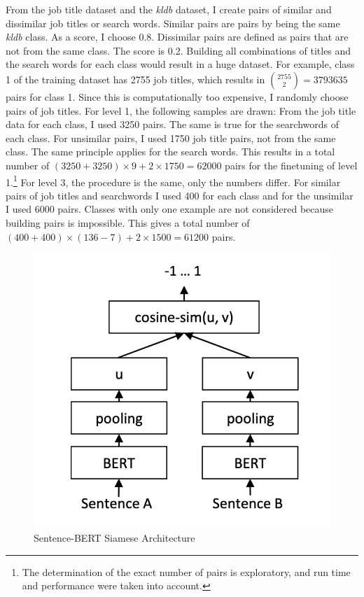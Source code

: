 \documentclass[12pt, a4paper, titlepage]{article}
\begin{document}
From the job title dataset and the \textit{kldb} dataset, I create pairs of similar and dissimilar job titles or search words. Similar pairs are pairs by being the same \textit{kldb} class. As a score, I choose 0.8. Dissimilar pairs are defined as pairs that are not from the same class. The score is 0.2. Building all combinations of titles and the search words for each class would result in a huge dataset. For example, class 1 of the training dataset has 2755 job titles, which results in ${2755 \choose 2} = 3793635$ pairs for class 1. Since this is computationally too expensive, I randomly choose pairs of job titles. For level 1, the following samples are drawn: From the job title data for each class, I used 3250 pairs. The same is true for the searchwords of each class. For unsimilar pairs, I used 1750 job title pairs, not from the same class. The same principle applies for the search words. This results in a total number of $(3250+3250) \times 9 + 2 \times 1750 = 62000$ pairs for the finetuning of level 1.\footnote{The determination of the exact number of pairs is exploratory, and run time and performance were taken into account.} For level 3, the procedure is the same, only the numbers differ. For similar pairs of job titles and searchwords I used 400 for each class and for the unsimilar I used 6000 pairs. Classes with only one example are not considered because building pairs is impossible. This gives a total number of $(400 + 400) \times (136-7) + 2 \times 1500 =  61200$ pairs. 

\begin{figure}[hb!]
  \center
  \includegraphics[scale=0.5]{SBERT.png}
  \caption[Sentence-BERT Siamese Structure]{\label{fig: F5} Sentence-\ac{BERT} Siamese Architecture \citep[3]{reimers2019}}
\end{figure}
\end{document}
